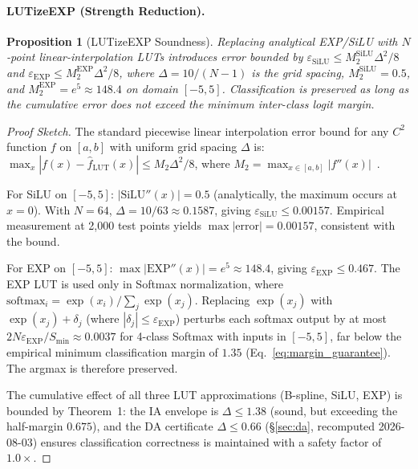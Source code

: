 \documentclass[journal,onecolumn]{IEEEtran}
\newtheorem{proposition}{Proposition}
\begin{document}
\paragraph{LUTizeEXP (Strength Reduction).}

\begin{proposition}[LUTizeEXP Soundness]
\label{prop:lutize_sound}
Replacing analytical EXP/SiLU with $N$-point linear-interpolation LUTs
introduces error bounded by $\varepsilon_{\text{SiLU}} \leq M_2^{\text{SiLU}}
\Delta^2/8$ and $\varepsilon_{\text{EXP}} \leq M_2^{\text{EXP}} \Delta^2/8$,
where $\Delta = 10/(N-1)$ is the grid spacing, $M_2^{\text{SiLU}} = 0.5$,
and $M_2^{\text{EXP}} = e^5 \approx 148.4$ on domain $[-5,5]$.
Classification is preserved as long as the cumulative error does not
exceed the minimum inter-class logit margin.
\end{proposition}

\begin{proof}[Proof Sketch]
The standard piecewise linear interpolation error bound for any $C^2$
function $f$ on $[a,b]$ with uniform grid spacing $\Delta$ is:
$\max_x |f(x) - \hat{f}_{\text{LUT}}(x)| \leq M_2 \Delta^2/8$, where
$M_2 = \max_{x\in[a,b]} |f''(x)|$~\cite{atkinson1989numerical}.

For SiLU on $[-5,5]$: $|\text{SiLU}''(x)| = 0.5$ (analytically,
the maximum occurs at $x=0$). With $N=64$,
$\Delta = 10/63 \approx 0.1587$, giving $\varepsilon_{\text{SiLU}} \leq 0.00157$.
Empirical measurement at 2,000 test points yields $\max|\text{error}| = 0.00157$,
consistent with the bound.

For EXP on $[-5,5]$: $\max|\text{EXP}''(x)| = e^5 \approx 148.4$, giving
$\varepsilon_{\text{EXP}} \leq 0.467$. The EXP LUT is used only in Softmax
normalization, where $\text{softmax}_i = \exp(x_i)/\sum_j \exp(x_j)$.
Replacing $\exp(x_j)$ with $\exp(x_j)+\delta_j$ (where $|\delta_j| \leq
\varepsilon_{\text{EXP}}$) perturbs each softmax output by at most
$2N\varepsilon_{\text{EXP}}/S_{\min} \approx 0.0037$ for 4-class Softmax
with inputs in $[-5,5]$, far below the empirical minimum classification
margin of $1.35$ (Eq.~\ref{eq:margin_guarantee}). The argmax is therefore
preserved.

The cumulative effect of all three LUT approximations (B-spline, SiLU, EXP)
is bounded by Theorem~1: the IA envelope is $\Delta \leq 1.38$ (sound, but
exceeding the half-margin $0.675$), and the DA certificate $\Delta \leq 0.66$
({\S}\ref{sec:da}, recomputed 2026-08-03) ensures classification
correctness is maintained with a safety factor of $1.0\times$.
\end{proof}
\end{document}
